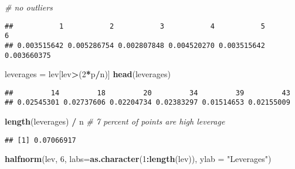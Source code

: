 \documentclass[
]{article}
\newenvironment{Shaded}{\begin{snugshade}}{\end{snugshade}}
\newcommand{\CommentTok}[1]{\textcolor[rgb]{0.56,0.35,0.01}{\textit{#1}}}
\newcommand{\DataTypeTok}[1]{\textcolor[rgb]{0.13,0.29,0.53}{#1}}
\newcommand{\DecValTok}[1]{\textcolor[rgb]{0.00,0.00,0.81}{#1}}
\newcommand{\KeywordTok}[1]{\textcolor[rgb]{0.13,0.29,0.53}{\textbf{#1}}}
\newcommand{\NormalTok}[1]{#1}
\newcommand{\OperatorTok}[1]{\textcolor[rgb]{0.81,0.36,0.00}{\textbf{#1}}}
\newcommand{\StringTok}[1]{\textcolor[rgb]{0.31,0.60,0.02}{#1}}
\begin{document}
\begin{Shaded}
\begin{Highlighting}[]
\CommentTok{# no outliers}
\end{Highlighting}
\end{Shaded}

\begin{Shaded}
\end{Shaded}

\begin{verbatim}
##           1           2           3           4           5           6 
## 0.003515642 0.005286754 0.002807848 0.004520270 0.003515642 0.003660375
\end{verbatim}

\begin{Shaded}
\begin{Highlighting}[]
\NormalTok{leverages =}\StringTok{ }\NormalTok{lev[lev}\OperatorTok{>}\NormalTok{(}\DecValTok{2}\OperatorTok{*}\NormalTok{p}\OperatorTok{/}\NormalTok{n)]}
\KeywordTok{head}\NormalTok{(leverages)}
\end{Highlighting}
\end{Shaded}

\begin{verbatim}
##         14         18         20         34         39         43 
## 0.02545301 0.02737606 0.02204734 0.02383297 0.01514653 0.02155009
\end{verbatim}

\begin{Shaded}
\begin{Highlighting}[]
\KeywordTok{length}\NormalTok{(leverages) }\OperatorTok{/}\StringTok{ }\NormalTok{n }\CommentTok{# 7 percent of points are high leverage}
\end{Highlighting}
\end{Shaded}

\begin{verbatim}
## [1] 0.07066917
\end{verbatim}

\begin{Shaded}
\begin{Highlighting}[]
\KeywordTok{halfnorm}\NormalTok{(lev, }\DecValTok{6}\NormalTok{, }\DataTypeTok{labs=}\KeywordTok{as.character}\NormalTok{(}\DecValTok{1}\OperatorTok{:}\KeywordTok{length}\NormalTok{(lev)), }\DataTypeTok{ylab =} \StringTok{"Leverages"}\NormalTok{)}
\end{Highlighting}
\end{Shaded}
\end{document}
